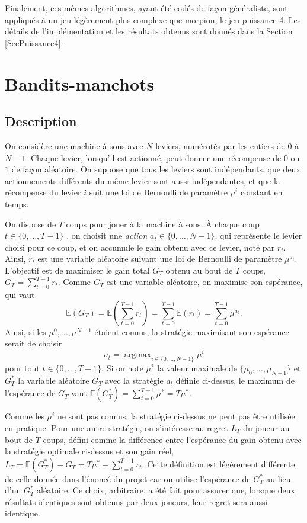 \documentclass[a4paper,11pt]{article}
\DeclareMathOperator*{\argmax}{argmax}
\begin{document}
Finalement, ces mêmes algorithmes, ayant été codés de façon généraliste, sont appliqués à un jeu légèrement plus complexe que morpion, le jeu puissance 4. Les détails de l'implémentation et les résultats obtenus sont donnés dans la Section \ref{SecPuissance4}.

\section{Bandits-manchots}
\label{SecBM}

\subsection{Description}

On considère une machine à sous avec $N$ leviers, numérotés par les entiers de $0$ à $N-1$. Chaque levier, lorsqu'il est actionné, peut donner une récompense de $0$ ou $1$ de façon aléatoire. On suppose que tous les leviers sont indépendants, que deux actionnements différents du même levier sont aussi indépendantes, et que la récompense du levier $i$ suit une loi de Bernoulli de paramètre $\mu^i$ constant en temps.

On dispose de $T$ coups pour jouer à la machine à sous. À chaque coup $t \in \{0, \dotsc, T-1\}$ , on choisit une \emph{action} $a_t \in \{0, \dotsc, N-1\}$, qui représente le levier choisi pour ce coup, et on accumule le gain obtenu avec ce levier, noté par $r_t$. Ainsi, $r_t$ est une variable aléatoire suivant une loi de Bernoulli de paramètre $\mu^{a_t}$. L'objectif est de maximiser le gain total $G_T$ obtenu au bout de $T$ coups, $G_T = \sum_{t=0}^{T-1} r_t$. Comme $G_T$ est une variable aléatoire, on maximise son espérance, qui vaut
\[
\mathbb E(G_T) = \mathbb E\left(\sum_{t=0}^{T-1} r_t\right) = \sum_{t=0}^{T-1} \mathbb E(r_t) = \sum_{t=0}^{T-1} \mu^{a_t}.
\]
Ainsi, si les $\mu^0, \dotsc, \mu^{N-1}$ étaient connus, la stratégie maximisant son espérance serait de choisir
\[a_t = \argmax_{i \in \{0, \dotsc, N-1\}} \mu^i\]
pour tout $t \in \{0, \dotsc, T-1\}$. Si on note $\mu^\ast$ la valeur maximale de $\{\mu_0, \dotsc, \mu_{N-1}\}$ et $G_T^\ast$ la variable aléatoire $G_T$ avec la stratégie $a_t$ définie ci-dessus, le maximum de l'espérance de $G_T$ vaut $\mathbb E(G_T^\ast) = \sum_{t=0}^{T-1} \mu^\ast = T \mu^\ast$.

Comme les $\mu^i$ ne sont pas connus, la stratégie ci-dessus ne peut pas être utilisée en pratique. Pour une autre stratégie, on s'intéresse au regret $L_T$ du joueur au bout de $T$ coups, défini comme la différence entre l'espérance du gain obtenu avec la stratégie optimale ci-dessus et son gain réel, $L_T = \mathbb E(G_T^\ast) - G_T = T \mu^\ast - \sum_{t=0}^{T-1} r_t$. Cette définition est légèrement différente de celle donnée dans l'énoncé du projet car on utilise l'espérance de $G_T^\ast$ au lieu d'un $G_T^\ast$ aléatoire. Ce choix, arbitraire, a été fait pour assurer que, lorsque deux résultats identiques sont obtenus par deux joueurs, leur regret sera aussi identique.
\end{document}
